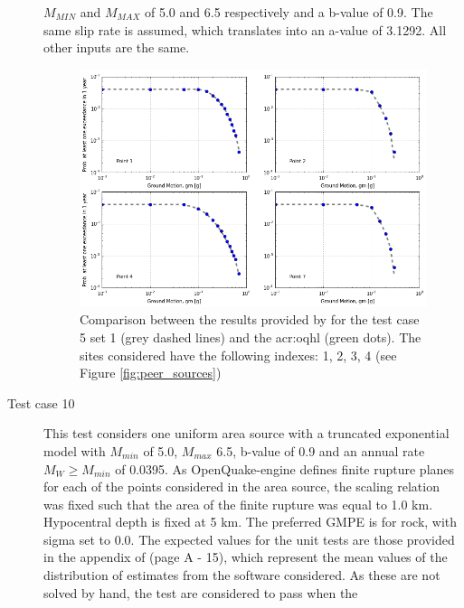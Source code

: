 \begin{description}
    $M_{MIN}$ and $M_{MAX}$ of 5.0 and 6.5 respectively and a b-value 
    of 0.9. The same slip rate is assumed, which translates into an a-value 
    of 3.1292. All other inputs are the same.
\begin{figure}[!ht]
\centering
\includegraphics[width=14cm]{./Pictures/qa/test05_set1.png}
\caption{Comparison between the results provided by \textcite{thomas2010}
for the test case 5 set 1 (grey dashed lines) and the \gls{acr:oqhl} 
(green dots). The sites considered have the following indexes: 
1, 2, 3, 4 (see Figure \ref{fig:peer_sources})}
\label{fig:peer_set1_test5}
\end{figure}
    \clearpage
    \item [Test case 10]
        This test considers one uniform area source with a truncated exponential 
        model with $M_{min}$ of 5.0, $M_{max}$ 6.5, b-value of 0.9 and an annual 
        rate $M_W \geq M_{min}$ of 0.0395. As OpenQuake-engine defines finite rupture 
        planes for each of the points considered in the area source, the scaling
        relation was fixed such that the area of the finite rupture was equal to 
        1.0 km. Hypocentral depth is fixed at 5 km. 
        The preferred GMPE is \cite{sadigh1997} for rock, with sigma set to 0.0. 
        The expected values for the unit tests are those provided in the appendix 
        of \cite{thomas2010} (page A - 15), which represent the mean values of the 
        distribution of estimates from the software considered. 
        As these are not solved by hand, the test are considered to pass when the 

\end{description}
